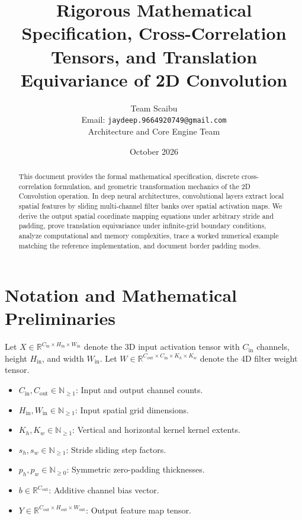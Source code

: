 \documentclass[11pt,a4paper]{article}
\title{\textbf{Rigorous Mathematical Specification, Cross-Correlation Tensors, and Translation Equivariance of 2D Convolution}}
\author{Team Scaibu \\ \small Email: \texttt{jaydeep.9664920749@gmail.com} \\ \small Architecture and Core Engine Team}
\date{October 2026}
\theoremstyle{definition}
\begin{document}
\maketitle

\begin{abstract}
This document provides the formal mathematical specification, discrete cross-correlation formulation, and geometric transformation mechanics of the 2D Convolution operation. In deep neural architectures, convolutional layers extract local spatial features by sliding multi-channel filter banks over spatial activation maps. We derive the output spatial coordinate mapping equations under arbitrary stride and padding, prove translation equivariance under infinite-grid boundary conditions, analyze computational and memory complexities, trace a worked numerical example matching the reference implementation, and document border padding modes.
\end{abstract}

\section{Notation and Mathematical Preliminaries}

Let $X \in \mathbb{R}^{C_{\text{in}} \times H_{\text{in}} \times W_{\text{in}}}$ denote the 3D input activation tensor with $C_{\text{in}}$ channels, height $H_{\text{in}}$, and width $W_{\text{in}}$. Let $W \in \mathbb{R}^{C_{\text{out}} \times C_{\text{in}} \times K_h \times K_w}$ denote the 4D filter weight tensor.

\begin{itemize}
    \item $C_{\text{in}}, C_{\text{out}} \in \mathbb{N}_{\ge 1}$: Input and output channel counts.
    \item $H_{\text{in}}, W_{\text{in}} \in \mathbb{N}_{\ge 1}$: Input spatial grid dimensions.
    \item $K_h, K_w \in \mathbb{N}_{\ge 1}$: Vertical and horizontal kernel kernel extents.
    \item $s_h, s_w \in \mathbb{N}_{\ge 1}$: Stride sliding step factors.
    \item $p_h, p_w \in \mathbb{N}_{\ge 0}$: Symmetric zero-padding thicknesses.
    \item $b \in \mathbb{R}^{C_{\text{out}}}$: Additive channel bias vector.
    \item $Y \in \mathbb{R}^{C_{\text{out}} \times H_{\text{out}} \times W_{\text{out}}}$: Output feature map tensor.
\end{itemize}
\end{document}
